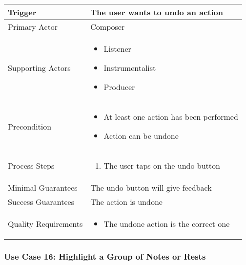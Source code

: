 \begin{tabularx}{\textwidth}{|X|X|}
\hline
Trigger & 
The user wants to undo an action \\
\hline
Primary Actor & 
Composer \\
\hline
Supporting Actors & 
\begin{itemize}
\item Listener
\item Instrumentalist
\item Producer
\end{itemize} \\
\hline
Precondition & 
\begin{itemize}
\item At least one action has been performed
\item Action can be undone
\end{itemize} \\
\hline
Process Steps & 
\begin{enumerate}
\item The user taps on the undo button
\end{enumerate} \\
\hline
Minimal Guarantees & 
The undo button will give feedback \\
\hline
Success Guarantees & 
The action is undone \\
\hline
Quality Requirements & 
\begin{itemize}
\item The undone action is the correct one 
\end{itemize} \\ 
\hline
\end{tabularx}


\subsubsection{Use Case 16: Highlight a Group of Notes or Rests}

